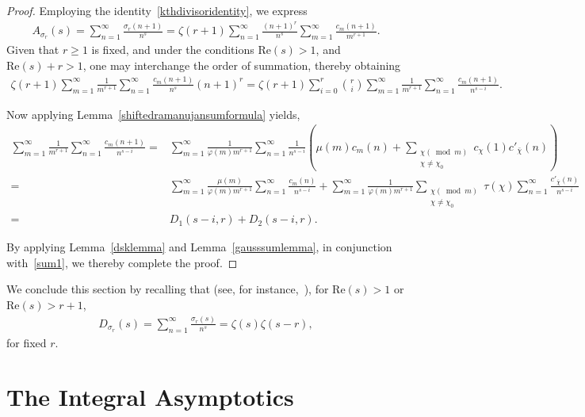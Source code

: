 \documentclass[12pt, oneside,reqno]{amsart}
\numberwithin{equation}{section}
\begin{document}
\begin{proof}
Employing the identity~\eqref{kthdivisoridentity}, we express
\begin{align*}
A_{\sigma_r}(s)
=\sum_{n=1}^{\infty}\frac{\sigma_r(n+1)}{n^s}
=\zeta(r+1)\sum_{n=1}^{\infty}\frac{(n+1)^{r}}{n^s}\sum_{m=1}^{\infty}\frac{c_m(n+1)}{m^{r+1}}.
\end{align*}
\noindent
Given that $r\geq 1$ is fixed, and under the conditions $\mathrm{Re}(s)>1$, and $\mathrm{Re}(s)+r>1$, one may interchange the order of summation, thereby obtaining
\begin{align}\label{sum1}
\zeta(r+1)\sum_{m=1}^{\infty}\frac{1}{m^{r+1}}\sum_{n=1}^{\infty}\frac{c_m(n+1)}{n^s}(n+1)^r
=\zeta(r+1)\sum_{i=0}^{r}\binom{r}{i}\sum_{m=1}^{\infty}\frac{1}{m^{r+1}}\sum_{n=1}^{\infty}\frac{c_m(n+1)}{n^{s-i}}.
\end{align}

Now applying Lemma~\ref{shiftedramanujansumformula} yields,
\begin{align*}
\sum_{m=1}^{\infty}\frac{1}{m^{r+1}}\sum_{n=1}^{\infty}\frac{c_m(n+1)}{n^{s-i}}
=&\sum_{m=1}^{\infty}\frac{1}{\varphi(m)m^{r+1}}\sum_{n=1}^{\infty}\frac{1}{n^{s-i}}\left(\mu(m)c_m(n)+\sum_{\substack{\chi(\bmod{m})\\ \chi\ne \chi_0}}c_{\chi}(1)c'_{\bar{\chi}}(n)\right)\\
=&\sum_{m=1}^{\infty}\frac{\mu(m)}{\varphi(m)m^{r+1}}\sum_{n=1}^{\infty}\frac{c_m(n)}{n^{s-i}}+\sum_{m=1}^{\infty}\frac{1}{\varphi(m)m^{r+1}}\sum_{\substack{\chi(\bmod{m})\\ \chi\ne \chi_0}}\tau(\chi)\sum_{n=1}^{\infty}\frac{c'_{\bar{\chi}}(n)}{n^{s-i}}\\
=&D_1(s-i,r)+D_2(s-i,r).
\end{align*}

\noindent
By applying Lemma~\ref{dsklemma} and Lemma~\ref{gausssumlemma}, in conjunction with~\eqref{sum1}, we thereby complete the proof.
\end{proof}


We conclude this section by recalling that (see, for instance,~\cite[\S1.3]{titchmarsh}), for $\mathrm{Re}(s)>1$ or $\mathrm{Re}(s)>r+1$,
\begin{align}\label{dsigmars}
D_{\sigma_r}(s)
=\sum_{n=1}^{\infty}\frac{\sigma_r(s)}{n^s}
=\zeta(s)\zeta(s-r),
\end{align}
for fixed $r$.


\section{The Integral Asymptotics}
\end{document}
